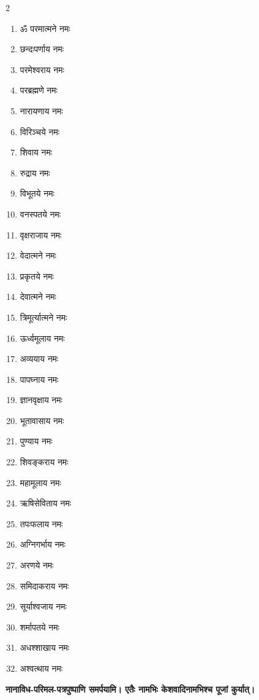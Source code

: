 \begin{multicols}{2}
\begin{enumerate}
  \item ॐ परमात्मने नमः
  \item छन्दःपर्णाय नमः
  \item परमेश्वराय नमः
  \item परब्रह्मणे नमः
  \item नारायणाय नमः
  \item विरिञ्चये नमः
  \item शिवाय नमः
  \item रुद्राय नमः
  \item विभूतये नमः
  \item वनस्पतये नमः
  \item वृक्षराजाय नमः
  \item वेदात्मने नमः
  \item प्रकृतये नमः
  \item देवात्मने नमः
  \item त्रिमूर्त्यात्मने नमः
  \item ऊर्ध्वमूलाय नमः
  \item अव्ययाय नमः
  \item पापघ्नाय नमः
  \item ज्ञानवृक्षाय नमः
  \item भूतावासाय नमः
  \item पुण्याय नमः
  \item शिवङ्कराय नमः
  \item महामूलाय नमः
  \item ऋषिसेविताय नमः
  \item तपःफलाय नमः
  \item अग्निगर्भाय नमः
  \item अरणये नमः
  \item समिदाकराय नमः
  \item सूर्याश्वजाय नमः
  \item शर्मापतये नमः
  \item अधश्शाखाय नमः
  \item अश्वत्थाय नमः
\end{enumerate}
\end{multicols}
\textbf{\devAya{} नानाविध-परिमल-पत्रपुष्पाणि समर्पयामि। एतैः नामभिः केशवादिनामभिश्च पूजां कुर्यात्।}

